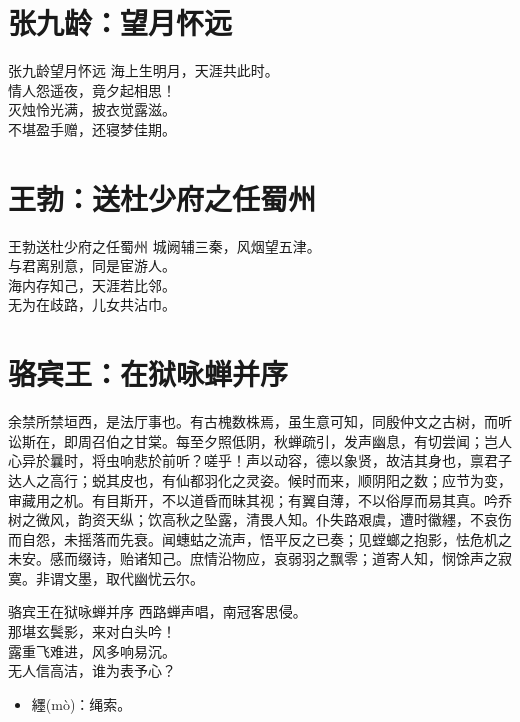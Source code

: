 \documentclass[12pt,oneside,a5paper]{book}
\begin{document}
\chapter{张九龄：望月怀远}
\begin{poemzh}{张九龄}{望月怀远}
海上生明月，天涯共此时。\\
情人怨遥夜，竟夕起相思！\\
灭烛怜光满，披衣觉露滋。\\
不堪盈手赠，还寝梦佳期。\\ 
\end{poemzh}

\chapter{王勃：送杜少府之任蜀州}
\begin{poemzh}{王勃}{送杜少府之任蜀州}
城阙辅三秦，风烟望五津。\\
与君离别意，同是宦游人。\\
海内存知己，天涯若比邻。\\
无为在歧路，儿女共沾巾。\\ 
\end{poemzh}

\chapter{骆宾王：在狱咏蝉并序}
余禁所禁垣西，是法厅事也。有古槐数株焉，虽生意可知，同殷仲文之古树，而听讼斯在，即周召伯之甘棠。每至夕照低阴，秋蝉疏引，发声幽息，有切尝闻；岂人心异於曩时，将虫响悲於前听？嗟乎！声以动容，德以象贤，故洁其身也，禀君子达人之高行；蜕其皮也，有仙都羽化之灵姿。候时而来，顺阴阳之数；应节为变，审藏用之机。有目斯开，不以道昏而昧其视；有翼自薄，不以俗厚而易其真。吟乔树之微风，韵资天纵；饮高秋之坠露，清畏人知。仆失路艰虞，遭时徽纆，不哀伤而自怨，未摇落而先衰。闻蟪蛄之流声，悟平反之已奏；见螳螂之抱影，怯危机之未安。感而缀诗，贻诸知己。庶情沿物应，哀弱羽之飘零；道寄人知，悯馀声之寂寞。非谓文墨，取代幽忧云尔。

\begin{poemzh}{骆宾王}{在狱咏蝉并序}
西路蝉声唱，南冠客思侵。\\
那堪玄鬓影，来对白头吟！\\
露重飞难进，风多响易沉。\\
无人信高洁，谁为表予心？\\ 
\end{poemzh}

\begin{itemize}
\item 纆(mò)：绳索。
\end{itemize}
\end{document}
